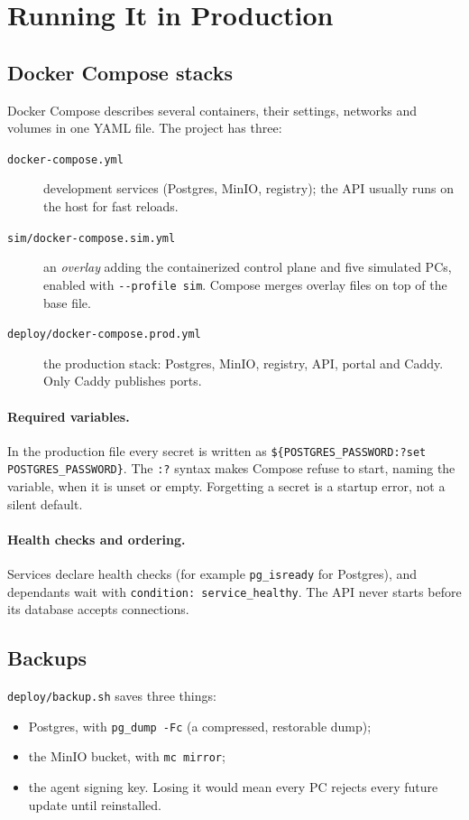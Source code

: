 \section{Running It in Production}

\subsection{Docker Compose stacks}

Docker Compose describes several containers, their settings, networks and
volumes in one YAML file. The project has three:

\begin{description}
\item[\texttt{docker-compose.yml}] development services (Postgres, MinIO,
  registry); the API usually runs on the host for fast reloads.
\item[\texttt{sim/docker-compose.sim.yml}] an \emph{overlay} adding the
  containerized control plane and five simulated PCs, enabled with
  \verb|--profile sim|. Compose merges overlay files on top of the base file.
\item[\texttt{deploy/docker-compose.prod.yml}] the production stack:
  Postgres, MinIO, registry, API, portal and Caddy. Only Caddy publishes ports.
\end{description}

\paragraph{Required variables.} In the production file every secret is
written as \verb|${POSTGRES_PASSWORD:?set POSTGRES_PASSWORD}|. The
\texttt{:?} syntax makes Compose refuse to start, naming the variable, when it
is unset or empty. Forgetting a secret is a startup error, not a silent default.

\paragraph{Health checks and ordering.} Services declare health checks (for
example \texttt{pg\_isready} for Postgres), and dependants wait with
\texttt{condition: service\_healthy}. The API never starts before its database
accepts connections.

\subsection{Backups}

\texttt{deploy/backup.sh} saves three things:
\begin{itemize}
\item Postgres, with \texttt{pg\_dump -Fc} (a compressed, restorable dump);
\item the MinIO bucket, with \texttt{mc mirror};
\item the agent signing key. Losing it would mean every PC rejects every future
  update until reinstalled.
\end{itemize}

